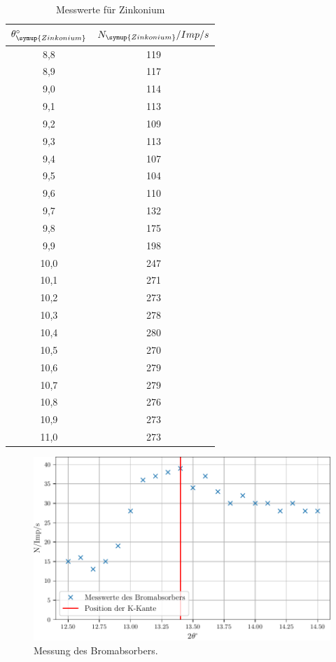\begin{table}
  \centering
  \caption{Messwerte für Zinkonium}
  \label{tab:zinkonium}
  \begin{tabular}{c c}
    \toprule
    $\theta_{\symup{Zinkonium}}^{\circ}$ & $N_{\symup{Zinkonium}}/Imp/s$ \\
    \midrule
     8,8 & 119 \\
     8,9 & 117 \\
     9,0 & 114 \\
     9,1 & 113 \\
     9,2 & 109 \\
     9,3 & 113 \\
     9,4 & 107 \\
     9,5 & 104 \\
     9,6 & 110 \\
     9,7 & 132 \\
     9,8 & 175 \\
     9,9 & 198 \\
    10,0 & 247 \\
    10,1 & 271 \\
    10,2 & 273 \\
    10,3 & 278 \\
    10,4 & 280 \\
    10,5 & 270 \\
    10,6 & 279 \\
    10,7 & 279 \\
    10,8 & 276 \\
    10,9 & 273 \\
    11,0 & 273 \\
    \bottomrule
  \end{tabular}
\end{table}

\begin{figure}
  \centering
  \includegraphics{build/brom.pdf}
  \caption{Messung des Bromabsorbers.}
  \label{fig:brom}
\end{figure}

